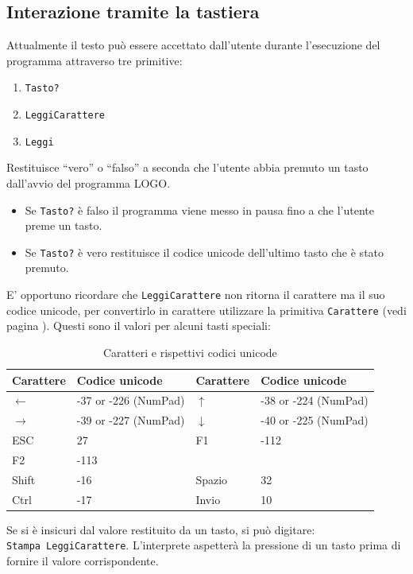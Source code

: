 \subsection{Interazione tramite la tastiera}
Attualmente il testo può essere accettato dall'utente durante l'esecuzione del programma attraverso tre primitive:
\begin{enumerate}
	\item \texttt{Tasto?}
	\item \texttt{LeggiCarattere}
	\item \texttt{Leggi}
\end{enumerate}

Restituisce ``vero'' o ``falso'' a seconda che l'utente abbia premuto un tasto dall'avvio del programma LOGO.\\

\begin{itemize}
	\item Se \texttt{Tasto?} è falso il programma viene messo in pausa fino a che l'utente preme un tasto.
	\item Se \texttt{Tasto?} è vero restituisce il codice unicode dell'ultimo tasto che è stato premuto.
\end{itemize}
E' opportuno ricordare che \texttt{LeggiCarattere} non ritorna il carattere ma il suo codice unicode, per convertirlo in carattere utilizzare la primitiva \texttt{Carattere} (vedi pagina \pageref{car}).
Questi sono il valori per alcuni tasti speciali:\\
\begin{table}[h]
	\begin{tabular}{|llll|}
		\hline
		Carattere & Codice unicode & Carattere & Codice unicode\\
		\hline
		$\leftarrow$	& -37 or -226 (NumPad)	& $\uparrow$	& -38 or -224 (NumPad)\\
		$\rightarrow$	& -39 or -227 (NumPad)	& $\downarrow$	& -40 or -225 (NumPad)\\
		ESC 			& 27 					& F1			& -112\\
		F2				& -113					& 				&\\
		Shift			& -16					& Spazio		& 32\\
		Ctrl			& -17					& Invio			& 10\\
		\hline
	\end{tabular}
	\caption{Caratteri e rispettivi codici unicode}
\end{table}
Se si è insicuri dal valore restituito da un tasto, si può digitare:\\
\texttt{Stampa LeggiCarattere}. L'interprete aspetterà la pressione di un tasto prima di fornire il valore corrispondente.\\
\\

